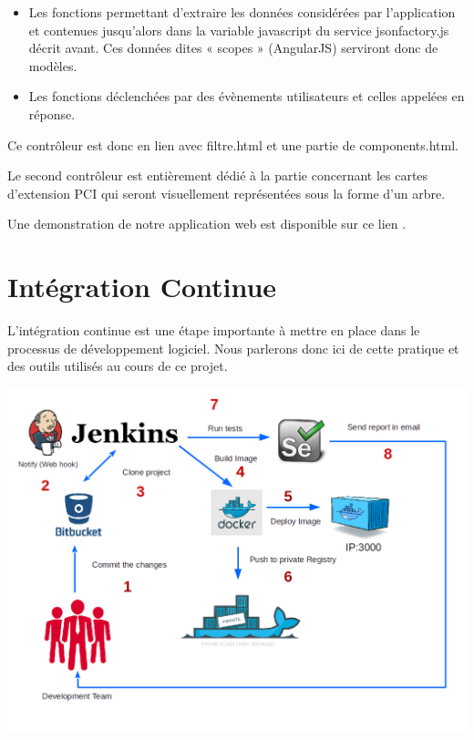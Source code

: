 \documentclass [a4paper,11pt]{article}
\begin{document}
\begin{itemize}
 \item Les fonctions permettant d’extraire les données considérées par l’application et contenues jusqu’alors dans la variable javascript du service jsonfactory.js décrit avant. Ces données dites « scopes » (AngularJS) serviront donc de modèles.
 \item Les fonctions déclenchées par des évènements utilisateurs et celles appelées en réponse.
 \newline
\end{itemize}

Ce contrôleur est donc en lien avec filtre.html et une partie de components.html.
\newline

Le second contrôleur est entièrement dédié à la partie concernant les cartes d’extension PCI qui seront visuellement représentées sous la forme d’un arbre.
\newline

Une demonstration de notre application web est disponible sur ce lien \cite{APPLI}.

\section{Intégration Continue}

L'intégration continue est une étape importante à mettre en place dans le processus de développement logiciel. Nous parlerons donc ici de cette pratique et des outils utilisés au cours de ce projet.

\begin{center}
\includegraphics[scale=0.5]{img/ci.png}
\end{center}
\end{document}
